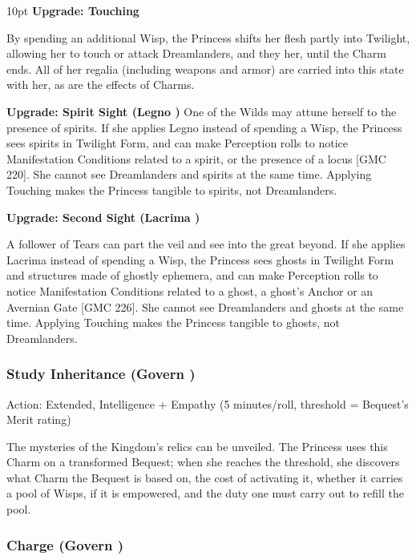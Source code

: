 \begin{myindentpar}{10pt} \textbf{Upgrade: Touching}
 
By spending an additional Wisp, the Princess shifts her flesh partly into Twilight, allowing her to touch or attack Dreamlanders, and they her, until the Charm ends. All of her regalia (including weapons and armor) are carried into this state with her, as are the effects of Charms.

\textbf{Upgrade: Spirit Sight (Legno \textbullet)}
One of the Wilds may attune herself to the presence of spirits. If she applies Legno instead of spending a Wisp, the Princess sees spirits in Twilight Form, and can make Perception rolls to notice Manifestation Conditions related to a spirit, or the presence of a locus [GMC 220]. She cannot see Dreamlanders and spirits at the same time. Applying Touching makes the Princess tangible to spirits, not Dreamlanders.

\textbf{Upgrade: Second Sight (Lacrima \textbullet)}

A follower of Tears can part the veil and see into the great beyond. If she applies Lacrima instead of spending a Wisp, the Princess sees ghosts in Twilight Form and structures made of ghostly ephemera, and can make Perception rolls to notice Manifestation Conditions related to a ghost, a ghost’s Anchor or an Avernian Gate [GMC 226]. She cannot see Dreamlanders and ghosts at the same time. Applying Touching makes the Princess tangible to ghosts, not Dreamlanders.

\end{myindentpar}

\subsubsection*{Study Inheritance (Govern \textbullet)}

\noindent Action: Extended, Intelligence + Empathy (5 minutes/roll, threshold = Bequest's Merit rating)

The mysteries of the Kingdom's relics can be unveiled. The Princess uses this Charm on a transformed Bequest; when she reaches the threshold, she discovers what Charm the Bequest is based on, the cost of activating it, whether it carries a pool of Wisps, if it is empowered, and the duty one must carry out to refill the pool.

\subsubsection*{Charge (Govern \textbullet\textbullet)}

